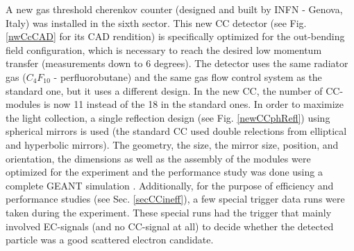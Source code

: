 A new gas threshold cherenkov counter (designed and built by INFN - Genova, Italy) was installed in the sixth sector. %
This new CC detector (see Fig. \ref{nwCcCAD} for its CAD rendition) is specifically optimized for the out-bending field configuration, which is necessary to reach the desired low momentum transfer (measurements down to 6 degrees). The detector uses the same radiator gas ($C_4 F_{10}$ - perfluorobutane) and the same gas flow control system as the standard %
one, but it uses a %
different design. %
In the new CC, the number of CC-modules %
is now 11 instead of the 18 in the standard ones. In order to maximize the light collection, a single reflection design (see Fig. \ref{newCCphRefl}) using spherical mirrors is used (the standard CC used double relections from elliptical and hyperbolic mirrors). The geometry, the size, the mirror size, position, and orientation, the dimensions as well as the assembly of the modules were optimized for the experiment %
and the performance study was %
done using a complete GEANT simulation \cite{propE03_006}. Additionally, for the purpose of efficiency and performance studies (see Sec. \ref{secCCineff}), a few special trigger data runs were taken during the experiment. These special runs had the trigger that mainly involved EC-signals (and no CC-signal at all) to decide whether the detected particle was a good scattered electron candidate.


